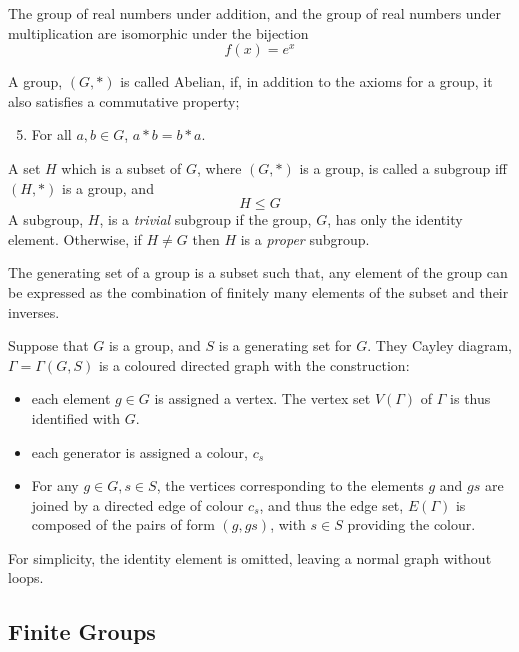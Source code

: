 \begin{example}
  The group of real numbers under addition, and the group of real
  numbers under multiplication are isomorphic under the bijection \[
  f(x) = e^x \]
\end{example}
\begin{definition}
  A group, $(G,*)$ is called Abelian, if, in addition to the axioms
  for a group, it also satisfies a commutative property;
  \begin{enumerate}
  \setcounter{enumi}{4}
\item For all $a,b \in G$, $a*b = b*a$.
  \end{enumerate}
\end{definition}
\begin{definition}[Subgroup]
  A set $H$ which is a subset of $G$, where $(G,*)$ is a group, is
  called a subgroup iff $(H,*)$ is a group, and \[ H \le G \] A
  subgroup, $H$, is a \emph{trivial} subgroup if the group, $G$, has
  only the identity element. Otherwise, if $H \neq G$ then $H$ is a
  \emph{proper} subgroup.
\end{definition}
\begin{definition}
  The generating set of a group is a subset such that, any element of
  the group can be expressed as the combination of finitely many
  elements of the subset and their inverses.
\end{definition}
\begin{definition}
  Suppose that $G$ is a group, and $S$ is a generating set for
  $G$. They Cayley diagram, $\Gamma = \Gamma(G,S)$ is a coloured
  directed graph with the construction:
  \begin{itemize}
  \item each element $g\in G$ is assigned a vertex. The vertex set
    $V(\Gamma)$ of $\Gamma$ is thus identified with $G$.
  \item  each generator is assigned a colour, $c_s$
  \item For any $g\in G, s \in S$, the vertices corresponding to the elements $g$ and $gs$ are joined by a directed edge of colour $c_s$, and thus the edge set, $E(\Gamma)$ is composed of the pairs of form $(g,gs)$, with $s\in S$ providing the colour.
  \end{itemize}
For simplicity, the identity element is omitted, leaving a normal graph without loops.
\end{definition}

\subsection{Finite Groups}
\label{sec:finiteexamples}

